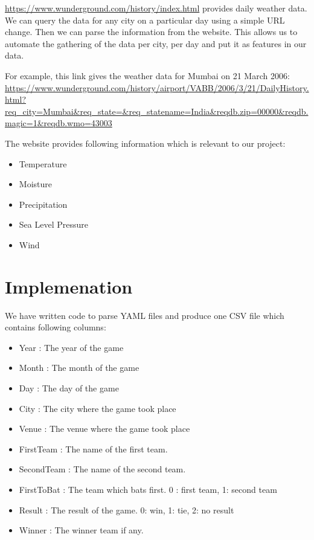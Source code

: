 \documentclass{article}
\begin{document}
\url{https://www.wunderground.com/history/index.html} provides daily weather data. We can query the data for any city on a particular day using a simple URL change. Then we can parse the information from the website. This allows us to automate the gathering of the data per city, per day and put it as features in our data.

For example, this link gives the weather data for Mumbai on 21 March 2006: \url{https://www.wunderground.com/history/airport/VABB/2006/3/21/DailyHistory.html?req_city=Mumbai&req_state=&req_statename=India&reqdb.zip=00000&reqdb.magic=1&reqdb.wmo=43003}

The website provides following information which is relevant to our project:

\begin{itemize}
    \item Temperature
    \item Moisture
    \item Precipitation
    \item Sea Level Pressure
    \item Wind
\end{itemize}

\section{Implemenation}

We have written code to parse YAML files and produce one CSV file which contains following columns:

\begin{itemize}
    \item Year : The year of the game
    \item Month : The month of the game
    \item Day : The day of the game
    \item City : The city where the game took place
    \item Venue : The venue where the game took place
    \item FirstTeam : The name of the first team.
    \item SecondTeam : The name of the second team.
    \item FirstToBat : The team which bats first. 0 : first team, 1: second team
    \item Result : The result of the game. 0: win, 1: tie, 2: no result
    \item Winner : The winner team if any.
\end{itemize}
\end{document}
